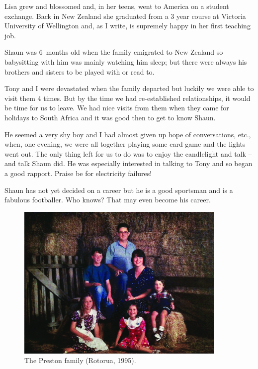 Lisa grew and blossomed and, in her teens, went to America on a
student exchange. Back in New Zealand she graduated from a 3 year
course at Victoria University of Wellington and, as I write, is
supremely happy in her first teaching job.

Shaun was 6~months old when the family emigrated to New Zealand so
babysitting with him was mainly watching him sleep; but there were
always his brothers and sisters to be played with or read to.

Tony and I were devastated when the family departed but luckily we
were able to visit them 4 times. But by the time we had re-established
relationships, it would be time for us to leave. We had nice visits
from them when they came for holidays to South Africa and it was good
then to get to know Shaun.

He seemed a very shy boy and I had almost given up hope of
conversations, etc., when, one evening, we were all together playing
some card game and the lights went out. The only thing left for us to
do was to enjoy the candlelight and talk -- and talk Shaun did.  He
was especially interested in talking to Tony and so began a good
rapport. Praise be for electricity failures!

Shaun has not yet decided on a career but he is a good sportsman and
is a fabulous footballer. Who knows? That may even become his career.

\begin{figure}
  \centering
  \includegraphics[width=0.9\textwidth]{photos/preston-family.jpg}
  \caption{The Preston family (Rotorua, 1995).}
  \label{preston-family}
\end{figure}

